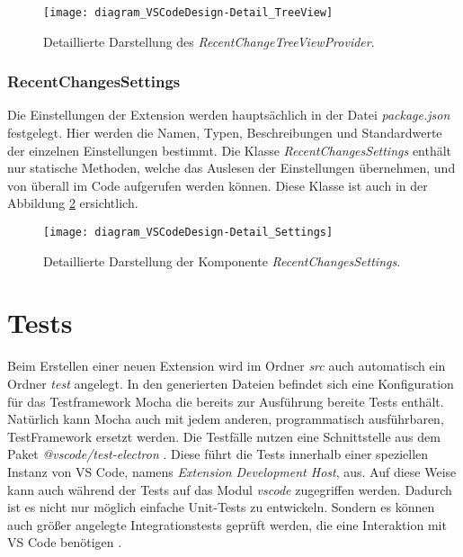 \begin{figure}
    \centering
    \texttt{[image: diagram\_VSCodeDesign-Detail\_TreeView]}
    \caption{Detaillierte Darstellung des \emph{RecentChangeTreeViewProvider}.}
    \label{fig:diagram_VSCodeDesign-Detail_TreeView}
\end{figure}   

\subsubsection{RecentChangesSettings}

Die Einstellungen der Extension werden hauptsächlich in der Datei
\emph{package.json} festgelegt. Hier werden die Namen, Typen, 
Beschreibungen und Standardwerte der einzelnen Einstellungen bestimmt.
Die Klasse \emph{RecentChangesSettings} enthält nur statische 
Methoden, welche das Auslesen der Einstellungen übernehmen, und
von überall im Code aufgerufen werden können.
Diese Klasse ist auch in der Abbildung \ref{fig:diagram_VSCodeDesign-Detail_Settings} 
ersichtlich.

\begin{figure}
    \centering
    \texttt{[image: diagram\_VSCodeDesign-Detail\_Settings]}
    \caption{Detaillierte Darstellung der Komponente \emph{RecentChangesSettings}.}
    \label{fig:diagram_VSCodeDesign-Detail_Settings}
\end{figure} 

\section{Tests}
\label{sec:EntwicklungVsCode_Tests}

Beim Erstellen einer neuen Extension wird im Ordner \emph{src} 
auch automatisch ein Ordner \emph{test} angelegt. 
In den generierten Dateien befindet sich 
eine Konfiguration für das Testframework Mocha \cite{MochaJSWebsite}
die bereits zur Ausführung bereite Tests enthält. Natürlich
kann Mocha auch mit jedem anderen, programmatisch ausführbaren,
TestFramework ersetzt werden. Die Testfälle nutzen eine Schnittstelle
aus dem Paket \emph{@vscode/test-electron} \cite{VSCodeTestElectronGithub}. 
Diese führt die Tests
innerhalb einer speziellen Instanz von VS Code, namens 
\emph{Extension Development Host}, aus. Auf diese Weise kann auch
während der Tests auf das Modul \emph{vscode} zugegriffen werden.
Dadurch ist es nicht nur möglich einfache Unit-Tests zu entwickeln.
Sondern es können auch größer angelegte Integrationstests
geprüft werden, die eine Interaktion mit VS Code benötigen 
\cite{VSCodeExtensionAPITestingExtensions}.

